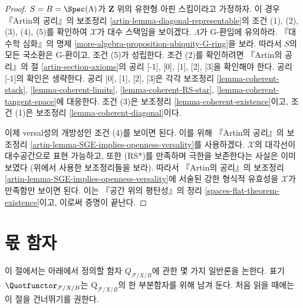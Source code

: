 \begin{proof}
\medskip\noindent
$S = B = \Spec(\Lambda)$가 $\mathbf{Z}$ 위의 유한형 아핀 스킴이라고
가정하자. 이 경우 『Artin의 공리』의 보조정리
\ref{artin-lemma-diagonal-representable}의 조건 (1), (2), (3), (4), (5)를
확인하여 $\mathcal{X}$가 대수 스택임을 보이겠다.
$\Lambda$가 G-환임에 유의하라. 『대수학 심화』의 명제
\ref{more-algebra-proposition-ubiquity-G-ring}을 보라.
따라서 $S$의 모든 국소환은 G-환이고, 조건 (5)가 성립한다.
조건 (2)를 확인하려면 『Artin의 공리』의 절
\ref{artin-section-axioms}의 공리 [-1], [0], [1], [2], [3]을 확인해야 한다.
공리 [-1]의 확인은 생략한다. 공리 [0], [1], [2], [3]은 각각 보조정리
\ref{lemma-coherent-stack},
\ref{lemma-coherent-limits},
\ref{lemma-coherent-RS-star},
\ref{lemma-coherent-tangent-space}에 대응한다.
조건 (3)은 보조정리 \ref{lemma-coherent-existence}이고,
조건 (1)은 보조정리 \ref{lemma-coherent-diagonal}이다.

\medskip\noindent
이제 versal성의 개방성인 조건 (4)를 보이면 된다. 이를 위해
『Artin의 공리』의 보조정리
\ref{artin-lemma-SGE-implies-openness-versality}를 사용하겠다.
$\mathcal{X}$의 대각선이 대수공간으로 표현 가능하고, 또한
(RS*)를 만족하며 극한을 보존한다는 사실은 이미 보였다
(위에서 사용한 보조정리들을 보라).
따라서 『Artin의 공리』의 보조정리
\ref{artin-lemma-SGE-implies-openness-versality}에 서술된 강한 형식적
유효성을 $\mathcal{X}$가 만족함만 보이면 된다. 이는 『공간 위의 평탄성』의
정리 \ref{spaces-flat-theorem-existence}이고, 이로써 증명이 끝난다.
\end{proof}









\section{몫 함자}
\label{section-functor-quotients}

\noindent
이 절에서는 아래에서 정의할 함자 $Q_{\mathcal{F}/X/B}$에 관한
몇 가지 일반론을 논한다. 표기 $\Quotfunctor_{\mathcal{F}/X/B}$는
$\text{Q}_{\mathcal{F}/X/B}$의 한 부분함자를 위해 남겨 둔다.
처음 읽을 때에는 이 절을 건너뛰기를 권한다.

